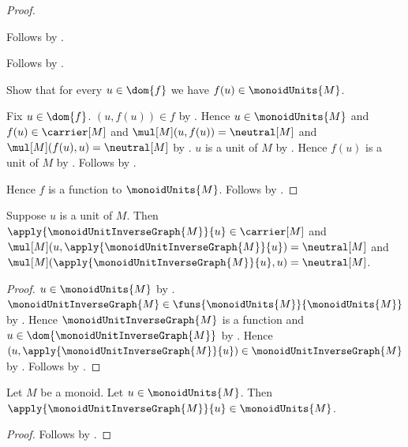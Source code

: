 \begin{proof}
\begin{subproof}
\begin{subproof}
\begin{subproof}
            \end{subproof}
            Follows by \auto.
        \end{subproof}
        Follows by .
    \end{subproof}
    Show that for every $u\in\dom{f}$ we have
        $f(u)\in\monoidUnits{M}$.
    \begin{subproof}
        Fix $u\in\dom{f}$.
        $(u,f(u))\in f$ by .
        Hence $u\in\monoidUnits{M}$ and
            $f(u)\in\carrier[M]$ and
            $\mul[M](u,f(u))=\neutral[M]$ and
            $\mul[M](f(u),u)=\neutral[M]$ by
            .
        $u$ is a unit of $M$ by .
        Hence $f(u)$ is a unit of $M$ by
            .
        Follows by .
    \end{subproof}
    Hence $f$ is a function to $\monoidUnits{M}$.
    Follows by .
\end{proof}

\begin{theorem}\label{monoid_unit_inverse_graph_apply}
    Suppose $u$ is a unit of $M$.
    Then $\apply{\monoidUnitInverseGraph{M}}{u}\in\carrier[M]$ and
        $\mul[M](u,\apply{\monoidUnitInverseGraph{M}}{u})
            =\neutral[M]$ and
        $\mul[M](\apply{\monoidUnitInverseGraph{M}}{u},u)
            =\neutral[M]$.
\end{theorem}
\begin{proof}
    $u\in\monoidUnits{M}$ by
        .
    $\monoidUnitInverseGraph{M}\in
        \funs{\monoidUnits{M}}{\monoidUnits{M}}$ by
        .
    Hence $\monoidUnitInverseGraph{M}$ is a function and
        $u\in\dom{\monoidUnitInverseGraph{M}}$ by
        .
    Hence
        $(u,\apply{\monoidUnitInverseGraph{M}}{u})
            \in\monoidUnitInverseGraph{M}$ by
        .
    Follows by .
\end{proof}

\begin{corollary}\label{monoid_unit_inverse_in_units}
    Let $M$ be a monoid.
    Let $u\in\monoidUnits{M}$.
    Then $\apply{\monoidUnitInverseGraph{M}}{u}\in\monoidUnits{M}$.
\end{corollary}
\begin{proof}
    Follows by
        .
\end{proof}

